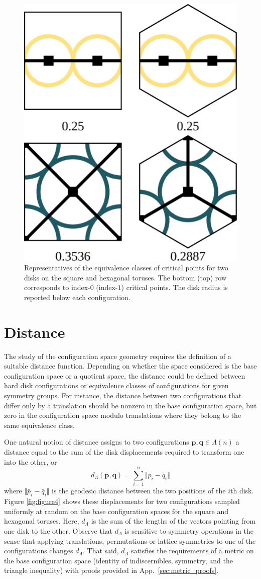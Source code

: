 \documentclass[default,iicol]{sn-jnl}%
\theoremstyle{thmstyleone}%
\theoremstyle{thmstyletwo}%
\theoremstyle{thmstylethree}%
\renewcommand{\vec}[1]{\bar{#1}}
\providecommand{\config}[1]{\mathbf{#1}}
\begin{document}
\begin{figure}
	\centering
	\includegraphics[width=0.5\columnwidth]{figure3.eps}
	\caption{Representatives of the equivalence classes of critical points for two disks on the square and hexagonal toruses. The bottom (top) row corresponds to index-$0$ (index-$1$) critical points. The disk radius is reported below each configuration.}
	\label{fig:figure3}
\end{figure}


\section{Distance}
\label{sec:distance_config}

The study of the configuration space geometry requires the definition of a suitable distance function. Depending on whether the space considered is the base configuration space or a quotient space, the distance could be defined between hard disk configurations or equivalence classes of configurations for given symmetry groups. For instance, the distance between two configurations that differ only by a translation should be nonzero in the base configuration space, but zero in the configuration space modulo translations where they belong to the same equivalence class.

One natural notion of distance assigns to two configurations $\config{p}, \config{q} \in \Lambda(n)$ a distance equal to the sum of the disk displacements required to transform one into the other, or
\begin{equation}
d_\Lambda(\config{p},\config{q}) = \sum_{i=1}^{n} {\Vert \vec{p}_i - \vec{q}_i \Vert}
\label{eq:labeled_distance}
\end{equation}
where $\Vert \vec{p}_i - \vec{q}_i \Vert$ is the geodesic distance between the two positions of the $i$th disk. Figure \ref{fig:figure4} shows these displacements for two configurations sampled uniformly at random on the base configuration spaces for the square and hexagonal toruses. Here, $d_\Lambda$ is the sum of the lengths of the vectors pointing from one disk to the other. Observe that $d_\Lambda$ is sensitive to symmetry operations in the sense that applying translations, permutations or lattice symmetries to one of the configurations changes $d_\Lambda$. That said, $d_\Lambda$ satisfies the requirements of a metric on the base configuration space (identity of indiscernibles, symmetry, and the triangle inequality) with proofs provided in App.\ \ref{sec:metric_proofs}.
\end{document}
